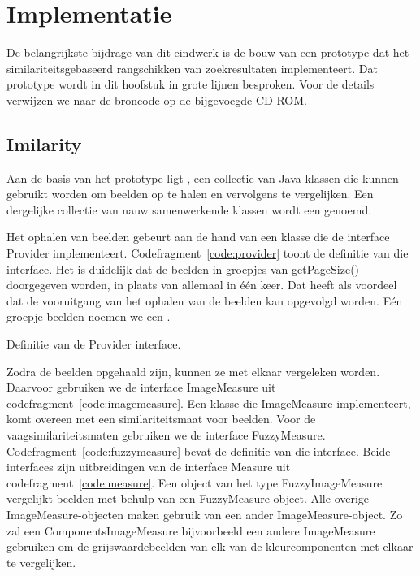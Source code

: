 \chapter{Implementatie}

De belangrijkste bijdrage van dit eindwerk is de bouw van een prototype
dat het similariteitsgebaseerd rangschikken van zoekresultaten implementeert.
Dat prototype wordt in dit hoofstuk in grote lijnen besproken. Voor de details
verwijzen we naar de broncode op de bijgevoegde CD-ROM.

\section{Imilarity}

Aan de basis van het prototype ligt , een collectie van Java klassen 
die kunnen gebruikt worden om beelden op te halen en vervolgens te vergelijken. Een 
dergelijke collectie van nauw samenwerkende klassen wordt een  genoemd. 

Het ophalen van beelden gebeurt aan de hand van een klasse die de interface 
{\klassefont Provider} implementeert. Codefragment~\ref{code:provider} toont de definitie
van die interface. Het is duidelijk dat de beelden in groepjes van 
{\klassefont getPageSize()} doorgegeven worden, in plaats van allemaal in \'e\'en keer. 
Dat heeft als voordeel dat de vooruitgang van het ophalen van de beelden kan 
opgevolgd worden. E\'en groepje beelden noemen we een .

\begin{code}[bp]
\vspace{5pt}
\begin{lgrind}

\end{lgrind}
\vspace{5pt}
\caption{\label{code:provider}Definitie van de {\klassefont Provider} interface.}
\end{code}

Zodra de beelden opgehaald zijn, kunnen ze met elkaar vergeleken worden. Daarvoor
gebruiken we de interface {\klassefont ImageMeasure} uit 
codefragment~\ref{code:imagemeasure}. Een klasse die {\klassefont ImageMeasure} 
implementeert, komt overeen met een similariteitsmaat voor beelden. Voor de 
vaagsimilariteitsmaten gebruiken we de interface {\klassefont FuzzyMeasure}.
Codefragment~\ref{code:fuzzymeasure} bevat de definitie van die interface.
Beide interfaces zijn uitbreidingen van de interface {\klassefont Measure}
uit codefragment~\ref{code:measure}. 
Een object van het type {\klassefont FuzzyImageMeasure} vergelijkt beelden
met behulp van een {\klassefont FuzzyMeasure}-object. Alle overige
{\klassefont ImageMeasure}-objecten maken gebruik van een ander 
{\klassefont ImageMeasure}-object. Zo zal een {\klassefont ComponentsImageMeasure}
bijvoorbeeld een andere {\klassefont ImageMeasure} gebruiken om de grijswaardebeelden
van elk van de kleurcomponenten met elkaar te vergelijken. 

